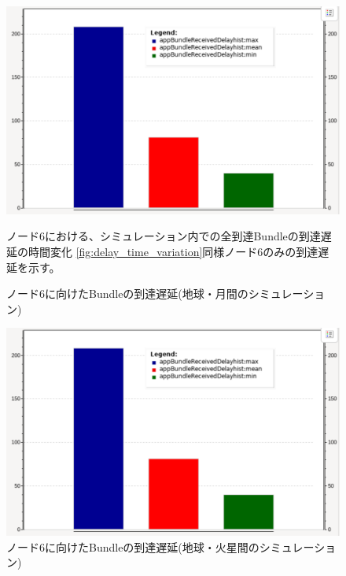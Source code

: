 \begin{figure}[tbh]
    \centering
    \includegraphics[width=0.7\textheight]{img/thesis_sample_delay_hist.pdf}
    \caption{ノード6に向けたBundleの到達遅延(地球・月間のシミュレーション)}
    \label{fig:total_delay_histgram_earth_moon}
    \begin{minipage}{\textwidth}
        \raggedright
        ノード6における、シミュレーション内での全到達Bundleの到達遅延の時間変化
        \ref{fig:delay_time_variation}同様ノード6のみの到達遅延を示す。
    \end{minipage}
\end{figure}

\begin{figure}[tbh]
    \centering
    \includegraphics[width=0.7\textheight]{img/thesis_sample_delay_hist.pdf}
    \caption{ノード6に向けたBundleの到達遅延(地球・火星間のシミュレーション)}
    \label{fig:total_delay_histgram_earth_mars}
    \begin{minipage}{\textwidth}
        \raggedright
    \end{minipage}
\end{figure}

